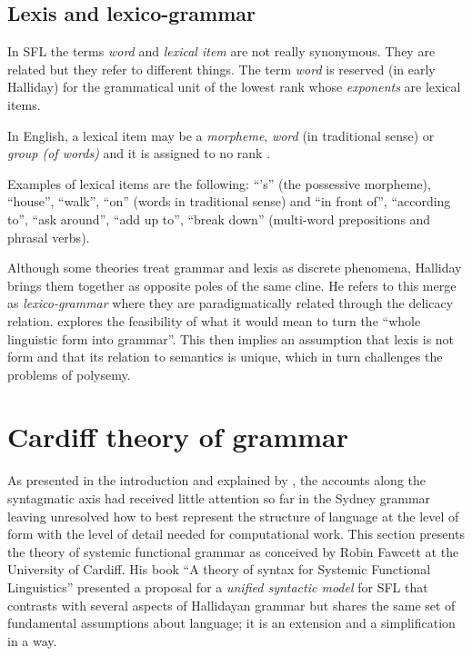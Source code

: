 \subsection{Lexis and lexico-grammar}
    In SFL the terms \textit{word} and \textit{lexical item} are not really synonymous. They are related but they refer to different things. The term \textit{word} is reserved (in early Halliday) for the grammatical unit of the lowest rank whose \textit{exponents} are lexical items. %
    
    \begin{definition}\label{def:lexical-item}
    	In English, a lexical item may be a \textit{morpheme}, \textit{word} (in traditional sense) or \textit{group (of words)} and it is assigned to no rank \citep[60]{Halliday2002}.
    \end{definition}
    
    Examples of lexical items are the following: ``'s'' (the possessive morpheme), ``house'', ``walk'', ``on'' (words in traditional sense) and ``in front of'', ``according to'', ``ask around'', ``add up to'', ``break down'' (multi-word prepositions and phrasal verbs).
    
    Although some theories treat grammar and lexis as discrete phenomena, Halliday brings them together as opposite poles of the same cline. He refers to this merge as \textit{lexico-grammar} where they are paradigmatically related through the delicacy relation.
    \citet{Hasan2014} explores the feasibility of what it would mean to turn the ``whole linguistic form into grammar''. This then implies an assumption that lexis is not form and that its relation to semantics is unique, which  in turn challenges the problems of polysemy. 


\section{Cardiff theory of grammar}
\label{sec:cardiff-theory-grammar}
    As presented in the introduction and explained by \citet{Bateman2008}, the accounts along the syntagmatic axis had received little attention so far in the Sydney grammar leaving unresolved how to best represent the structure of language at the level of form with the level of detail needed for computational work. This section presents the theory of systemic functional grammar as conceived by Robin Fawcett at the University of Cardiff. His book ``A theory of syntax for Systemic Functional Linguistics'' \citep{Fawcett2000} presented a proposal for a \textit{unified syntactic model} for SFL that contrasts with several aspects of Hallidayan grammar but shares the same set of fundamental assumptions about language; it is an extension and a simplification in a way.
    
